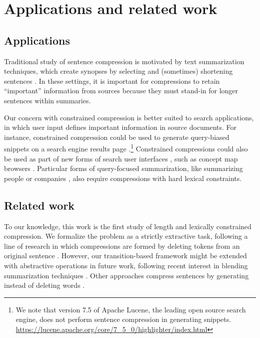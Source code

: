 \documentclass[11pt,a4paper]{article}
\begin{document}
\section{Applications and related work}

\subsection{Applications}

Traditional study of sentence compression is motivated by text summarization techniques, which create synopses by selecting and (sometimes) shortening sentences \cite{Knight2000StatisticsBasedS,vanderwende2007beyond,martins2009summarization}. 
In these settings, it is important for compressions to retain ``important'' information from sources because they must stand-in for longer sentences within summaries.

Our concern with constrained compression is better suited to search applications, in which user input defines important information in source documents. For instance, constrained compression could be used to generate query-biased snippets on a search engine results page \cite{tombros1998advantages,Metzler2008MachineLS,kanungo2009predicting}.\footnote{We note that version 7.5 of Apache Lucene, the leading open source search engine, does not perform sentence compression in generating snippets. \url{https://lucene.apache.org/core/7_5_0/highlighter/index.html}} Constrained compressions could also be used as part of new forms of search user interfaces \cite{hearst2009search}, such as concept map browsers \cite{falke2017graphdocexplore}. Particular forms of query-focused summarization, like summarizing people \cite{w04} or companies \cite{filippova2009company}, also require compressions with hard lexical constraints. 

\subsection{Related work}

To our knowledge, this work is the first study of length and lexically constrained compression. We formalize the problem as a strictly extractive task, following a line of research in which compressions are formed by deleting tokens from an original sentence \cite{clarke2008global,filippova2008dependency,filippova2015sentence}. However, our transition-based framework might be extended with abstractive operations in future work, following recent interest in blending summarization techniques \cite{P17-1099}. Other approaches compress sentences by generating instead of deleting words \cite{rush2015neural,mallinson18}. 
\end{document}
